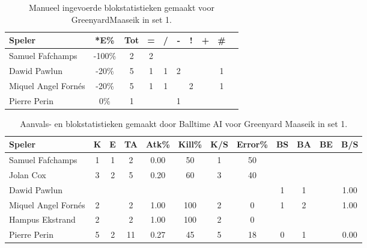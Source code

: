 \begin{table}[ht!]
    \centering
    \scriptsize
    \begin{tabular}{|l|c|c|c|c|c|c|c|c|c|} \hline
        \textbf{Speler} & *E\% & Tot & = & / & - & ! & + & \# \\ \hline
        Samuel Fafchamps & -100\% & 2 & 2 &  &  &  &  & \\ 
        Dawid Pawlun & -20\% & 5 & 1 & 1 & 2 & & & 1 \\ 
        Miquel Angel Fornés & -20\% & 5 & 1 & 1 &  & 2 & & 1 \\
        Pierre Perin & 0\% & 1 &  &  & 1 &  &  &\\ \hline
    \end{tabular}
    \caption[Manueel ingevoerde blokstatistieken gemaakt Greenyard Maaseik in set 1]{\label{tab:PL3BlockMaaseikMan1}Manueel ingevoerde blokstatistieken gemaakt voor GreenyardMaaseik in set 1.}
\end{table}

\begin{table}[ht!]
  \centering
  \scriptsize
    \begin{tabular}{|l|c|c|c|c|c|c|c|c|c|c|c|} \hline
    \textbf{Speler} & K & E & TA & Atk\% & Kill\% & K/S & Error\% & BS & BA & BE & B/S \\ \hline
    Samuel Fafchamps & 1 & 1 & 2 & 0.00 & 50 & 1 & 50 &  &  &  & \\
    Jolan Cox & 3 & 2 & 5 & 0.20 & 60 & 3 & 40 &   &  &  &  \\
    Dawid Pawlun &   &   &   &   &   &   &   & 1 & 1 & & 1.00\\
    Miquel Angel Fornés & 2 &  & 2 & 1.00 & 100 & 2 & 0 & 1 & 2 & & 1.00\\
    Hampus Ekstrand & 2 &  & 2 & 1.00 & 100 & 2 & 0 &  & & & \\
    Pierre Perin & 5 & 2 & 11 & 0.27 & 45 & 5 & 18 & 0 & 1 &  & 0.00\\ \hline
  \end{tabular}
  \caption[Aanvals- en blokstatistieken gemaakt door Balltime AI voor Greenyard Maaseik in set 1]{\label{tab:PL3AttBlockMaaseik1}Aanvals- en blokstatistieken gemaakt door Balltime AI voor Greenyard Maaseik in set 1.}
\end{table}
    